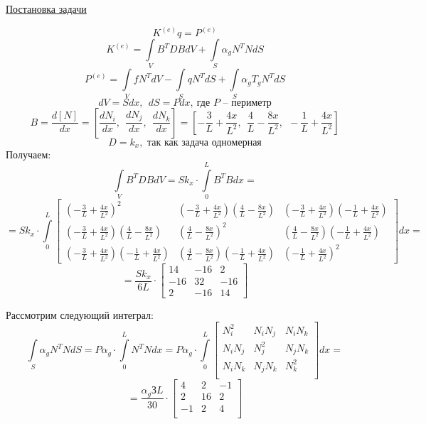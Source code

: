 \documentclass{bmstu}
\begin{document}
\begin{center}
\underline{Постановка задачи}
\end{center}
\[K^{(e)} q = P^{(e)}\]
\[K^{(e)} = \int \limits_V B^T D B dV + \int \limits_S \alpha_g N^T N dS\]
\[P^{(e)} = \int \limits_V f N^T dV - \int \limits_S q N^T dS + \int \limits_S \alpha_g T_g N^T dS\]
\[dV = Sdx,\ \ dS = Pdx,\ \text{где } P \text{ -- периметр}\]
\[B = \frac{d[N]}{dx} = \left[ \frac{dN_i}{dx},\ \  \frac{dN_j}{dx},\ \  \frac{dN_k}{dx}\right] = \left[ -\frac{3}{L} + \frac{4x}{L^2},\ \  \frac{4}{L} - \frac{8x}{L^2},\ \  -\frac{1}{L} + \frac{4x}{L^2}\right]\]
\[D = k_x, \text{ так как задача одномерная}\]
Получаем:
\[\int \limits_V B^T D B dV = S k_x \cdot \int \limits_0^L  B^T B dx =\]
\[= Sk_x \cdot \int \limits_0^L
\begin{bmatrix}
\left(-\frac{3}{L} + \frac{4x}{L^2} \right)^2 & \left(-\frac{3}{L} + \frac{4x}{L^2} \right)\left(\frac{4}{L} - \frac{8x}{L^2} \right) & \left(-\frac{3}{L} + \frac{4x}{L^2} \right)\left(-\frac{1}{L} + \frac{4x}{L^2} \right) \\
\left(-\frac{3}{L} + \frac{4x}{L^2} \right)\left(\frac{4}{L} - \frac{8x}{L^2} \right) & \left(\frac{4}{L} - \frac{8x}{L^2} \right)^2 & \left(\frac{4}{L} - \frac{8x}{L^2} \right)\left(-\frac{1}{L} + \frac{4x}{L^2} \right)\\
\left(-\frac{3}{L} + \frac{4x}{L^2} \right)\left(-\frac{1}{L} + \frac{4x}{L^2} \right)& \left(\frac{4}{L} - \frac{8x}{L^2} \right)\left(-\frac{1}{L} + \frac{4x}{L^2} \right) & \left(-\frac{1}{L} + \frac{4x}{L^2} \right)^2
\end{bmatrix} dx =\]
\[= \frac{Sk_x}{6L} \cdot 
\begin{bmatrix}
14 & -16 & 2\\
-16 & 32 & -16\\
2 & -16 & 14
\end{bmatrix}\]

Рассмотрим следующий интеграл:
\[\int \limits_S \alpha_g N^T N dS = P \alpha_g \cdot \int \limits_0^L N^T N dx = P \alpha_g
\cdot \int \limits_0^L \begin{bmatrix}
N_i^2 & N_iN_j & N_iN_k \\
N_iN_j & N_j^2 & N_jN_k \\
N_iN_k & N_jN_k & N_k^2 \\
\end{bmatrix} dx = \]
\[= \frac{\alpha_g З L}{30} \cdot \begin{bmatrix}
4 & 2 & -1 \\
2 & 16 & 2 \\
-1 & 2 & 4 \\
\end{bmatrix}\]
\end{document}

